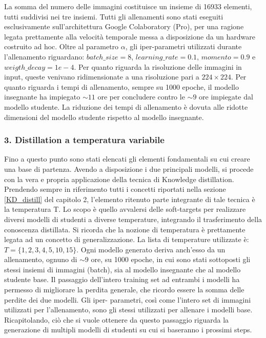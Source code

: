 La somma del numero delle immagini costituisce un insieme di 16933 
elementi, tutti suddivisi nei tre insiemi. Tutti gli allenamenti sono stati 
eseguiti esclusivamente sull'architettura Google Colaboratory (Pro), per una 
ragione legata prettamente alla velocità temporale messa a disposizione da un 
hardware costruito ad hoc. Oltre al parametro $\alpha$, gli iper-parametri utilizzati 
durante l'allenamento riguardano: $batch\_size=8$, $learning\_rate=0.1$, 
$momento=0.9$ e $weigth\_decay=1e-4$. Per quanto riguarda la risoluzione 
delle immagini in input, queste venivano ridimensionate a una risoluzione 
pari a $224\times{224}$. Per quanto riguarda i tempi di allenamento, sempre su 
1000 epoche, il modello insegnante ha impiegato $\sim{11}$ ore per concludere 
contro le $\sim{9}$ ore impiegate dal modello studente. La riduzione dei tempi di 
allenamento è dovuta alle ridotte dimensioni del modello studente rispetto 
al modello insegnante. 

\subsubsection{3. Distillation a temperatura variabile}
Fino a questo punto sono stati elencati gli elementi fondamentali su cui 
creare una base di partenza. Avendo a disposizione i due principali modelli, 
si procede con la vera e propria applicazione della tecnica di Knowledge 
distillation. Prendendo sempre in riferimento tutti i concetti riportati nella 
sezione \ref{KD_distill} del capitolo 2, l'elemento ritenuto parte integrante di tale 
tecnica è la temperatura T. Lo scopo è quello avvalersi delle soft-targets 
per realizzare diversi modelli di studenti a diverse temperature, integrando 
il trasferimento della conoscenza distillata. Si ricorda che la nozione di 
temperatura è prettamente legata ad un concetto di generalizzazione. La 
lista di temperature utilizzate è: $T=\{1, 2, 3, 4, 5, 10, 15\}$. Ogni modello 
generato deriva anch'esso da un allenamento, ognuno di $\sim{9}$ ore, su 1000 
epoche, in cui sono stati sottoposti gli stessi insiemi di immagini (batch), sia 
al modello insegnante che al modello studente base. Il passaggio dell'intero 
training set ad entrambi i modelli ha permesso di migliorare la perdita 
generale, che ricordo essere la somma delle perdite dei due modelli. Gli iper-
parametri, così come l'intero set di immagini utilizzati per l'allenamento, 
sono gli stessi utilizzati per allenare i modelli base. Ricapitolando, ciò che 
si vuole ottenere da questo passaggio riguarda la generazione di multipli 
modelli di studenti su cui si baseranno i prossimi steps. 

